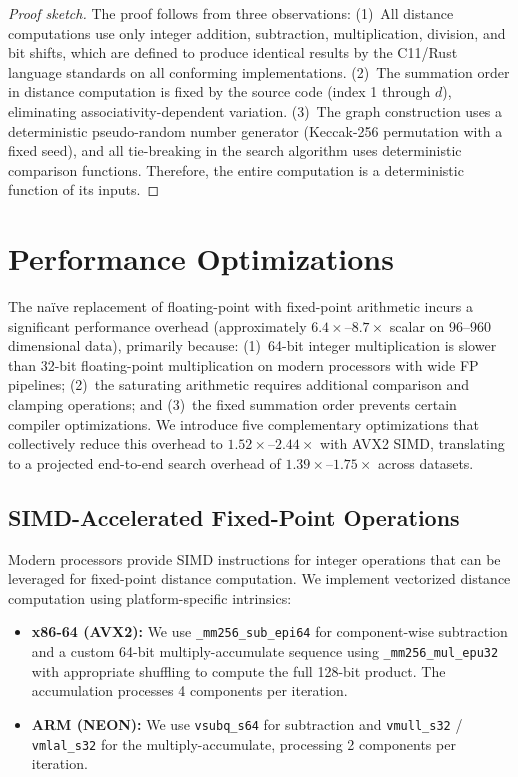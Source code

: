 \documentclass[10pt,journal]{IEEEtran}
\begin{document}
\begin{proof}[Proof sketch]
The proof follows from three observations: (1)~All distance computations use only integer addition, subtraction, multiplication, division, and bit shifts, which are defined to produce identical results by the C11/Rust language standards on all conforming implementations. (2)~The summation order in distance computation is fixed by the source code (index 1 through $d$), eliminating associativity-dependent variation. (3)~The graph construction uses a deterministic pseudo-random number generator (Keccak-256 permutation with a fixed seed), and all tie-breaking in the search algorithm uses deterministic comparison functions. Therefore, the entire computation is a deterministic function of its inputs.
\end{proof}


\section{Performance Optimizations}
\label{sec:optimizations}

The na\"ive replacement of floating-point with fixed-point arithmetic incurs a significant performance overhead (approximately $6.4\times$--$8.7\times$ scalar on 96--960 dimensional data), primarily because: (1)~64-bit integer multiplication is slower than 32-bit floating-point multiplication on modern processors with wide FP pipelines; (2)~the saturating arithmetic requires additional comparison and clamping operations; and (3)~the fixed summation order prevents certain compiler optimizations. We introduce five complementary optimizations that collectively reduce this overhead to $1.52\times$--$2.44\times$ with AVX2 SIMD, translating to a projected end-to-end search overhead of $1.39\times$--$1.75\times$ across datasets.

\subsection{SIMD-Accelerated Fixed-Point Operations}

Modern processors provide SIMD instructions for integer operations that can be leveraged for fixed-point distance computation. We implement vectorized distance computation using platform-specific intrinsics:

\begin{itemize}[leftmargin=*]
  \item \textbf{x86-64 (AVX2):} We use \texttt{\_mm256\_sub\_epi64} for component-wise subtraction and a custom 64-bit multiply-accumulate sequence using \texttt{\_mm256\_mul\_epu32} with appropriate shuffling to compute the full 128-bit product. The accumulation processes 4 components per iteration.

  \item \textbf{ARM (NEON):} We use \texttt{vsubq\_s64} for subtraction and \texttt{vmull\_s32} / \texttt{vmlal\_s32} for the multiply-accumulate, processing 2 components per iteration.
\end{itemize}
\end{document}
